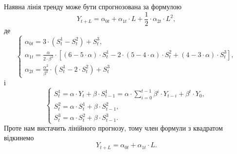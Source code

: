 Наявна лінія тренду може бути спрогнозована за формулою
\begin{equation*}
  Y_{t + L} = \alpha_{0 t} + \alpha_{1 t} \cdot L + \frac{1}{2} \cdot \alpha_{2 t} \cdot L^2,
\end{equation*}
де
\begin{equation*}
  \begin{cases}
      \alpha_{0 t} = 3 \cdot \left( S_t^1 - S_t^2 \right) + S_t^3, \\
      \alpha_{1 t}
          = \frac{\alpha}{2 \cdot \beta^2} \cdot \left[
              \left( 6 - 5 \cdot \alpha \right) \cdot S_t^1
              - 2 \cdot \left( 5 - 4 \cdot \alpha \right) \cdot S_t^2
              + \left( 4 - 3 \cdot \alpha \right) \cdot S_t^3
            \right], \\
      \alpha_{2 t} = \frac{\alpha^2}{\beta^2} \cdot \left( S_t^1 - 2 \cdot S_t^2 \right) + S_t^3
  \end{cases}
\end{equation*}
і
\begin{equation*}
  \begin{cases}
      S_t^1 = \alpha \cdot Y_t + \beta \cdot S_{t-1}^1
            = \alpha \cdot \sum\limits_{i=0}^{t-1} \beta^i \cdot Y_{t-i} + \beta^t \cdot Y_0, \\
      S_t^2 = \alpha \cdot S_t^1 + \beta \cdot S_{t-1}^2, \\
      S_t^3 = \alpha \cdot S_t^2 + \beta \cdot S_{t-1}^3.
  \end{cases}
\end{equation*}
Проте нам вистачить лінійного прогнозу,
тому член формули з квадратом відкинемо
\begin{equation*}
  Y_{t + L} = \alpha_{0 t} + \alpha_{1 t} \cdot L.
\end{equation*}

